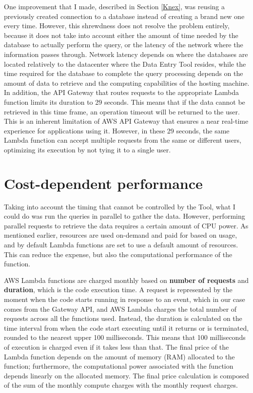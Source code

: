 One improvement that I made, described in Section \ref{Knex}, was reusing a previously created connection to a database instead of creating a brand new one every time. However, this shrewdness does not resolve the problem entirely, because it does not take into account either the amount of time needed by the database to actually perform the query, or the latency of the network where the information passes through. Network latency depends on where the databases are located relatively to the datacenter where the Data Entry Tool resides, while the time required for the database to complete the query processing depends on the amount of data to retrieve and the computing capabilities of the hosting machine. In addition, the API Gateway that routes requests to the appropriate Lambda function limits its duration to 29 seconds. This means that if the data cannot be retrieved in this time frame, an operation timeout will be returned to the user. This is an inherent limitation of AWS API Gateway that ensures a near real-time experience for applications using it. However, in these 29 seconds, the same Lambda function can accept multiple requests from the same or different users, optimizing its execution by not tying it to a single user.

\section{Cost-dependent performance}
Taking into account the timing that cannot be controlled by the Tool, what I could do was run the queries in parallel to gather the data. 
However, performing parallel requests to retrieve the data requires a certain amount of CPU power.
As mentioned earlier, resources are used on-demand and paid for based on usage, and by default Lambda functions are set to use a default amount of resources. This can reduce the expense, but also the computational performance of the function. 

AWS Lambda functions are charged monthly based on \textbf{number of requests} and \textbf{duration}, which is the code execution time. A request is represented by the moment when the code starts running in response to an event, which in our case comes from the Gateway API, and AWS Lambda charges the total number of requests across all the functions used. Instead, the duration is calculated on the time interval from when the code start executing until it returns or is terminated, rounded to the nearest upper 100 milliseconds. This means that 100 milliseconds of execution is charged even if it takes less than that. The final price of the Lambda function depends on the amount of memory (RAM) allocated to the function; furthermore, the computational power associated with the function depends linearly on the allocated memory. 
The final price calculation is composed of the sum of the monthly compute charges with the monthly request charges.

